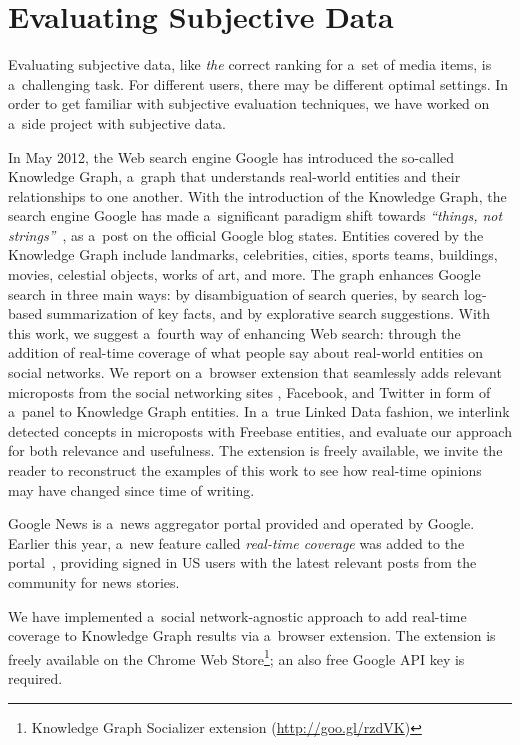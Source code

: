 \section{Evaluating Subjective Data}
Evaluating subjective data, like \emph{the} correct ranking
for a~set of media items, is a~challenging task.
For different users, there may be different optimal settings.
In order to get familiar with subjective evaluation techniques,
we have worked on a~side project with subjective data.

In May 2012, the Web search engine Google has introduced the so-called Knowledge Graph,
a~graph that understands real-world entities and their relationships to one another.
With the introduction of the Knowledge Graph, the search engine Google
has made a~significant paradigm shift towards \textit{``things, not strings''}~\cite{singhal2012},
as a~post on the official Google blog states.
Entities covered by the Knowledge Graph include landmarks, celebrities, cities, sports
teams, buildings, movies, celestial objects, works of art, and more.
The graph enhances Google search in three main ways:
by disambiguation of search queries,
by search log-based summarization of key facts,
and by explorative search suggestions.
With this work, we suggest a~fourth way of enhancing Web search:
through the addition of real-time coverage
of what people say about real-world entities on social networks.
We report on a~browser extension that seamlessly adds relevant microposts
from the social networking sites \googleplus, Facebook, and Twitter
in form of a~panel to Knowledge Graph entities.
In a~true Linked Data fashion, we interlink detected concepts in microposts
with Freebase entities, and evaluate our approach for both relevance and usefulness.
The extension is freely available,
we invite the reader to reconstruct the examples of this work
to see how real-time opinions may have changed since time of writing.

Google News is a~news aggregator portal provided and operated by Google.
Earlier this year, a~new feature called \emph{real-time coverage}
was added to the portal~\cite{zuccarino2012}, providing signed in US \googleplus users
with the latest relevant posts from the \googleplus community for news stories.

We have implemented a~social network-agnostic approach
to add real-time coverage to Knowledge Graph results via a~browser extension.
The extension is freely available on the Chrome Web
Store\footnote{Knowledge Graph Socializer extension (\url{http://goo.gl/rzdVK})};
an also free Google API key is required.

